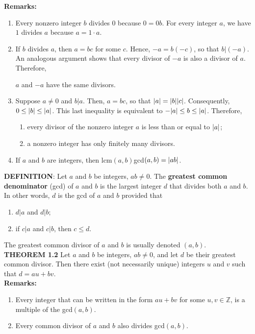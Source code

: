 \documentclass[12pt]{article}
\newcommand{\Z}{\mathbb{Z}}
\DeclarePairedDelimiter\abs{\lvert}{\rvert}%
\begin{document}
\noindent
\textbf{Remarks:}
\begin{enumerate}
\item Every nonzero integer $b$ divides $0$ because $0=0b$. For every integer $a$, we have  $1$ divides $a$ because $a=1\cdot a$.
\item If $b$ divides $a$, then $a=bc$ for some $c$. Hence, $-a=b(-c)$, so that $b|(-a)$. An analogous argument shows that every divisor of $-a$ is also a divisor of $a$. Therefore, 
\begin{center}
$a$ and $-a$ have the same divisors.
\end{center}

\item Suppose $a \neq 0$ and $b|a$. Then, $a=bc$, so that $\abs{a}=\abs{b}\abs{c}$. Consequently, $0 \leq \abs{b} \leq \abs{a}$. This last inequality is equivalent to $-\abs{a} \leq b \leq \abs{a}$. Therefore,
\begin{center}
\begin{enumerate}[label=(\alph*)]
\item every divisor of the nonzero integer $a$ is less than or equal to $\abs{a}$;
\item a nonzero integer has only finitely many divisors.
\end{enumerate}
\end{center}
\item If $a$ and $b$ are integers, then lcm$(a,b)$gcd$(a,b)=\abs{ab}$.
\end{enumerate}

\noindent
\textbf{DEFINITION}: Let $a$ and $b$ be integers, $ab \neq 0$. The \textbf{greatest common denominator} (gcd) of $a$ and $b$ is the largest integer $d$ that divides both $a$ and $b$. In other words, $d$ is the gcd of $a$ and $b$ provided that 
\begin{enumerate}
\item $d|a$ and $d|b$;
\item if $c|a$ and $c|b$, then $c \leq d$.
\end{enumerate} 
\noindent
The greatest common divisor of $a$ and $b$ is usually denoted $(a,b)$.\\

\noindent
\textbf{THEOREM 1.2} Let $a$ and $b$ be integers, $ab \neq 0$, and let $d$ be their greatest common divisor. Then there exist (not necessarily unique) integers $u$ and $v$ such that $d=au+bv$. \\
\noindent
\textbf{Remarks:}
\begin{enumerate}
\item Every integer that can be written in the form $au+bv$ for some $u, v \in \Z$, is a multiple of the gcd$(a,b)$.
\item Every common divisor of $a$ and $b$ also divides gcd$(a,b)$.
\end{enumerate}
\end{document}
